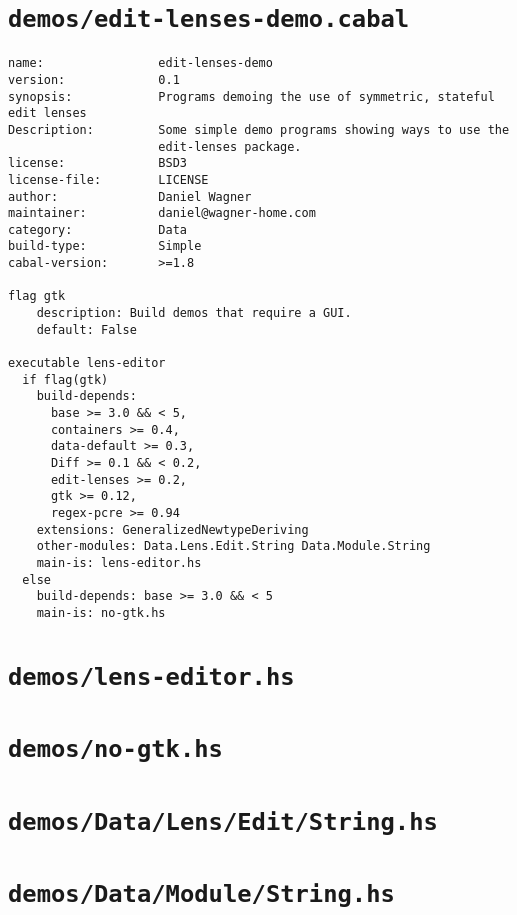 \section{\texttt{demos/edit-lenses-demo.cabal}}
\begin{verbatim}
name:                edit-lenses-demo
version:             0.1
synopsis:            Programs demoing the use of symmetric, stateful edit lenses
Description:         Some simple demo programs showing ways to use the
                     edit-lenses package.
license:             BSD3
license-file:        LICENSE
author:              Daniel Wagner
maintainer:          daniel@wagner-home.com
category:            Data
build-type:          Simple
cabal-version:       >=1.8

flag gtk
    description: Build demos that require a GUI.
    default: False

executable lens-editor
  if flag(gtk)
    build-depends:
      base >= 3.0 && < 5,
      containers >= 0.4,
      data-default >= 0.3,
      Diff >= 0.1 && < 0.2,
      edit-lenses >= 0.2,
      gtk >= 0.12,
      regex-pcre >= 0.94
    extensions: GeneralizedNewtypeDeriving
    other-modules: Data.Lens.Edit.String Data.Module.String
    main-is: lens-editor.hs
  else
    build-depends: base >= 3.0 && < 5
    main-is: no-gtk.hs
\end{verbatim}

\section{\texttt{demos/lens-editor.hs}}
\label{mod:lens-editor}


\section{\texttt{demos/no-gtk.hs}}
\label{mod:no-gtk}


\section{\texttt{demos/Data/Lens/Edit/String.hs}}
\label{mod:Data.Lens.Edit.String}


\section{\texttt{demos/Data/Module/String.hs}}
\label{mod:Data.Module.String}


